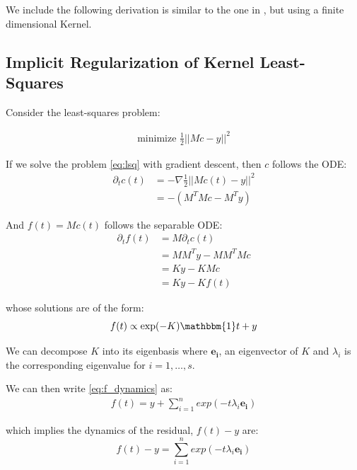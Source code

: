 We include the following derivation is similar to the one in \cite{NTKJacot}, but using a finite dimensional Kernel.

\subsection{Implicit Regularization of Kernel Least-Squares}
Consider the least-squares problem:

\begin{equation}\label{eq:lsq}
\begin{gathered}
    \text{minimize } \frac{1}{2} ||Mc - y||^2
\end{gathered}
\end{equation}

If we solve the problem \eqref{eq:lsq} with gradient descent, then $c$ follows the ODE:
\begin{align}
    \partial_t c(t) &= - \nabla \frac{1}{2} ||Mc(t) - y||^2\\
                    &= -(M^T M c - M^T y)
\end{align}

And $f(t) = Mc(t)$ follows the separable ODE:
\begin{align}
    \partial_t f(t) &= M \partial_t c(t)\\
                    &= M M^T y - M M^T M c\\
                    &= K y - K Mc \\
                    &= K y - K f(t)
\end{align}

whose solutions are of the form:
\begin{equation}\label{eq:f_dynamics}
    f(t) \propto \exp(-K) \mathbbm{1} t + y
\end{equation}

We can decompose $K$ into its eigenbasis where $\mathbf{e_i}$, an eigenvector of $K$ and $\lambda_i$ is the corresponding eigenvalue for $i = 1, \ldots, s$. 

We can then write \eqref{eq:f_dynamics} as:
\begin{align}
    f(t) = y + \sum_{i=1}^n exp(-t \lambda_i \mathbf{e_i})
\end{align}

which implies the dynamics of the residual, $f(t) - y$ are:
\begin{equation}\label{eq:eigenkernel}
    f(t) - y = \sum_{i=1}^n exp(-t \lambda_i \mathbf{e_i})
\end{equation}

